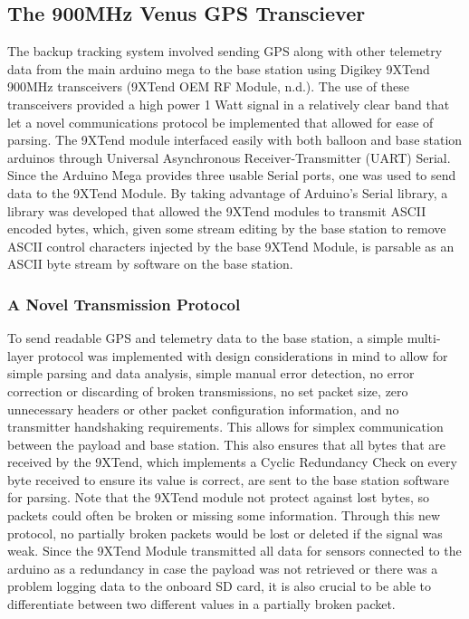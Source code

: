 \documentclass[12pt,]{article}
\begin{document}
\subsection{The 900MHz Venus GPS
Transciever}\label{the-900mhz-venus-gps-transciever}

The backup tracking system involved sending GPS along with other
telemetry data from the main arduino mega to the base station using
Digikey 9XTend 900MHz transceivers (9XTend OEM RF Module, n.d.). The use
of these transceivers provided a high power 1 Watt signal in a
relatively clear band that let a novel communications protocol be
implemented that allowed for ease of parsing. The 9XTend module
interfaced easily with both balloon and base station arduinos through
Universal Asynchronous Receiver-Transmitter (UART) Serial. Since the
Arduino Mega provides three usable Serial ports, one was used to send
data to the 9XTend Module. By taking advantage of Arduino's Serial
library, a library was developed that allowed the 9XTend modules to
transmit ASCII encoded bytes, which, given some stream editing by the
base station to remove ASCII control characters injected by the base
9XTend Module, is parsable as an ASCII byte stream by software on the
base station.

\subsubsection{A Novel Transmission
Protocol}\label{a-novel-transmission-protocol}

To send readable GPS and telemetry data to the base station, a simple
multi-layer protocol was implemented with design considerations in mind
to allow for simple parsing and data analysis, simple manual error
detection, no error correction or discarding of broken transmissions, no
set packet size, zero unnecessary headers or other packet configuration
information, and no transmitter handshaking requirements. This allows
for simplex communication between the payload and base station. This
also ensures that all bytes that are received by the 9XTend, which
implements a Cyclic Redundancy Check on every byte received to ensure
its value is correct, are sent to the base station software for parsing.
Note that the 9XTend module not protect against lost bytes, so packets
could often be broken or missing some information. Through this new
protocol, no partially broken packets would be lost or deleted if the
signal was weak. Since the 9XTend Module transmitted all data for
sensors connected to the arduino as a redundancy in case the payload was
not retrieved or there was a problem logging data to the onboard SD
card, it is also crucial to be able to differentiate between two
different values in a partially broken packet.
\end{document}
